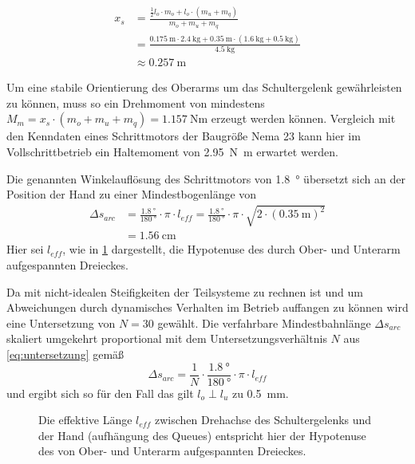 		\begin{align}
			x_s &= \frac{\frac{1}{2}l_o \cdot m_o + l_o \cdot \left(m_u + m_q\right)}{m_o + m_u + m_q} \nonumber \\
				&= \frac{\SI{0,175}{\metre} \cdot \SI{2,4}{\kilo\gram} + \SI{0,35}{\metre} \cdot \left(\SI{1,6}{\kilo\gram} + \SI{0,5}{\kilo\gram}\right)}{\SI{4,5}{\kilo\gram}} \nonumber \\
				&\approx \SI{0,257}{\metre}%
				\label{eq:massenschwerpunkt arme}
		\end{align}

		Um eine stabile Orientierung des Oberarms um das Schultergelenk gewährleisten zu können, muss so ein Drehmoment von mindestens \(M_m = x_s \cdot \left(m_o + m_u + m_q\right) = \SI{1,157}{\newton\metre}\) erzeugt werden können.
		Vergleich mit den Kenndaten eines Schrittmotors der Baugröße Nema 23 \cite{nanotec.specs} kann hier im Vollschrittbetrieb ein Haltemoment von \SI{2,95}{\newton\metre} erwartet werden.\par\medskip
		Die genannten Winkelauflösung des Schrittmotors von \SI{1,8}{\degree} übersetzt sich an der Position der Hand zu einer Mindestbogenlänge von
		\begin{align}
			\Delta s_{arc} 	&= \frac{\SI{1,8}{\degree}}{\SI{180}{\degree}} \cdot \pi \cdot l_{eff} = \frac{\SI{1,8}{\degree}}{\SI{180}{\degree}} \cdot \pi \cdot \sqrt{2 \cdot \left(\SI{0,35}{\metre}\right)^2} \nonumber \\
							&= \SI{1,56}{\cm}
		\end{align}
		Hier sei \(l_{eff}\), wie in \cref{fig:schultergelenk winkelaufloesung} dargestellt, die Hypotenuse des durch Ober- und Unterarm aufgespannten Dreieckes.\par
		Da mit nicht-idealen Steifigkeiten der Teilsysteme zu rechnen ist und um Abweichungen durch dynamisches Verhalten im Betrieb auffangen zu können wird eine Untersetzung von \(N = 30\) gewählt.
		Die verfahrbare Mindestbahnlänge \(\Delta s_{arc}\) skaliert umgekehrt proportional mit dem Untersetzungsverhältnis \(N\) aus \cref{eq:untersetzung} gemäß
		\begin{equation}
			\Delta s_{arc} = \frac{1}{N} \cdot \frac{\SI{1,8}{\degree}}{\SI{180}{\degree}} \cdot \pi \cdot l_{eff}
		\end{equation}
		und ergibt sich so für den Fall das gilt \(l_o \perp l_u\) zu \SI{0,5}{\mm}.
		\begin{figure}[h]
			\centering
			
			\caption[Die effektive Länge \(l_{eff}\) zwischen Drehachse des Schultergelenks und der Hand]{Die effektive Länge \(l_{eff}\) zwischen Drehachse des Schultergelenks und der Hand (aufhängung des Queues) entspricht hier der Hypotenuse des von Ober- und Unterarm aufgespannten Dreieckes.}%
			\label{fig:schultergelenk winkelaufloesung}
		\end{figure}
	
